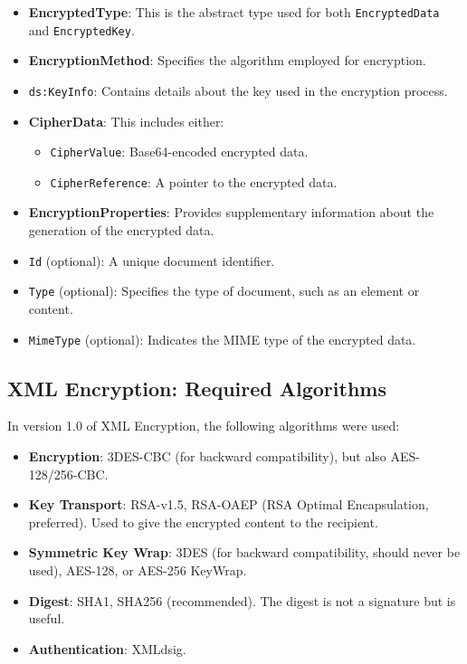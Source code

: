 \begin{itemize}
    \item \textbf{EncryptedType}: This is the abstract type used for
      both \texttt{EncryptedData} and \texttt{EncryptedKey}.
    
    \item \textbf{EncryptionMethod}: Specifies the algorithm employed
      for encryption.
    
    \item \texttt{ds:KeyInfo}: Contains details about the key used in
      the encryption process.
    
    \item \textbf{CipherData}: This includes either:
    \begin{itemize}
        \item \texttt{CipherValue}: Base64-encoded encrypted data.
        \item \texttt{CipherReference}: A pointer to the encrypted data.
    \end{itemize}
    
    \item \textbf{EncryptionProperties}: Provides supplementary
      information about the generation of the encrypted data.
    
    \item \texttt{Id} (optional): A unique document identifier.
    
    \item \texttt{Type} (optional): Specifies the type of document,
      such as an element or content.
    
    \item \texttt{MimeType} (optional): Indicates the MIME type of the
      encrypted data.
\end{itemize}

\subsection{XML Encryption: Required Algorithms}

In version 1.0 of XML Encryption, the following algorithms were used:

\begin{itemize}
    \item \textbf{Encryption}: 3DES-CBC (for backward compatibility), but also AES-128/256-CBC.
    \item \textbf{Key Transport}: RSA-v1.5, RSA-OAEP (RSA Optimal Encapsulation, preferred). Used to give the encrypted content to the recipient.
    \item \textbf{Symmetric Key Wrap}: 3DES (for backward compatibility, should never be used), AES-128, or AES-256 KeyWrap.
    \item \textbf{Digest}: SHA1, SHA256 (recommended). The digest is not a signature but is useful.
    \item \textbf{Authentication}: XMLdsig.
\end{itemize}

